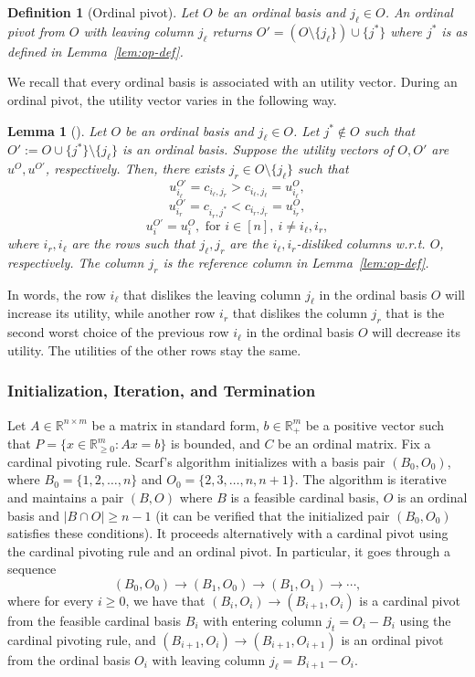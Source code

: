 \documentclass[11pt]{article}
\newcommand{\R}{\mathbb{R}}
\newtheorem{lemma}[theorem]{Lemma}
\newtheorem{definition}[theorem]{Definition}
\begin{document}
\begin{definition}[Ordinal pivot]\label{def:appopdef}
Let $O$ be an ordinal basis and $j_\ell\in O$. An \emph{ordinal pivot} from $O$ with leaving column $j_\ell$ returns $O'=(O\setminus \{j_\ell\}) \cup \{j^*\}$ where $j^*$ is as defined in Lemma~\ref{lem:op-def}.
\end{definition}

We recall that every ordinal basis is associated with an utility vector. During an ordinal pivot, the utility vector varies in the following way.

\begin{lemma}[\cite{scarf1967core}]\label{lem:utility}
    Let $O$ be an ordinal basis and $j_\ell\in O$. 
    Let $j^*\notin O$ such that $O':=O\cup\{j^*\}\setminus\{j_\ell\}$ is an ordinal basis. Suppose the utility vectors of $O,O'$ are $u^O,u^{O'}$, respectively. Then, there exists $j_r\in O\setminus\{j_\ell\}$ such that
    $$u^{O'}_{i_\ell}=c_{i_\ell,j_r}>c_{i_\ell,j_\ell}=u^O_{i_\ell},$$
    $$u^{O'}_{i_r}=c_{i_r,j^*}<c_{i_r,j_r}=u^O_{i_r},$$
    $$u^{O'}_{i}=u^O_{i},\textrm{ for $i \in [n],\  i \neq i_\ell,i_r$},$$
    where $i_r,i_\ell$ are the rows such that $j_\ell,j_r$ are the $i_\ell,i_r$-disliked columns w.r.t. $O$, respectively. The column $j_r$ is the reference column in Lemma~\ref{lem:op-def}. \end{lemma}


In words, the row $i_\ell$ that dislikes the leaving column $j_\ell$ in the ordinal basis $O$ will increase its utility, while another row $i_r$ that dislikes the column $j_r$ that is the second worst choice of the previous row $i_\ell$ in the ordinal basis $O$ will decrease its utility. The utilities of the other rows stay the same.
\fi

\subsubsection{Initialization, Iteration, and Termination}\label{sec:iteration}
Let $A\in \R^{n\times m}$ be a matrix in standard form, $b\in \R^m_{+}$ be a positive vector such that $P=\{x\in \R^m_{\ge 0}: Ax = b\}$ is bounded, and $C$ be an ordinal matrix. Fix a cardinal pivoting rule. Scarf's algorithm initializes with a basis pair $(B_0,O_0)$, where $B_0=\{1,2,\dots,n\}$ and $O_0=\{2,3,\dots,n,n+1\}$. 
The algorithm is iterative and maintains a pair $(B,O)$ where $B$ is a feasible cardinal basis, $O$ is an ordinal basis and $|B\cap O|\ge n-1$ (it can be verified that the initialized pair $(B_0, O_0)$ satisfies these conditions). It proceeds alternatively with a cardinal pivot using the cardinal pivoting rule and an ordinal pivot. In particular, it goes through a sequence
\begin{equation}\label{eq:iterations}
    (B_0,O_0)\to (B_1,O_0)\to (B_1,O_1)\to \cdots,
\end{equation}
where for every $i\ge 0$, we have that $(B_i,O_i)\to (B_{i+1},O_i)$ is a cardinal pivot from the feasible cardinal basis $B_i$ with entering column $j_t=O_i-B_i$ using the cardinal pivoting rule, and $(B_{i+1},O_i)\to(B_{i+1},O_{i+1})$ is an ordinal pivot from the ordinal basis $O_i$ with leaving column $j_\ell=B_{i+1}-O_i$.
\end{document}
